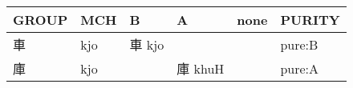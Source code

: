 \documentclass[14pt,a4paper]{scrartcl}
\begin{document}
\begin{longtable}[c]{@{}llllll@{}}
\toprule
\begin{minipage}[b]{0.14\columnwidth}\raggedright\strut
GROUP
\strut\end{minipage} &
\begin{minipage}[b]{0.14\columnwidth}\raggedright\strut
MCH
\strut\end{minipage} &
\begin{minipage}[b]{0.14\columnwidth}\raggedright\strut
B
\strut\end{minipage} &
\begin{minipage}[b]{0.14\columnwidth}\raggedright\strut
A
\strut\end{minipage} &
\begin{minipage}[b]{0.14\columnwidth}\raggedright\strut
none
\strut\end{minipage} &
\begin{minipage}[b]{0.14\columnwidth}\raggedright\strut
PURITY
\strut\end{minipage}\tabularnewline
\midrule
\endhead
\begin{minipage}[t]{0.14\columnwidth}\raggedright\strut
車
\strut\end{minipage} &
\begin{minipage}[t]{0.14\columnwidth}\raggedright\strut
kjo
\strut\end{minipage} &
\begin{minipage}[t]{0.14\columnwidth}\raggedright\strut
車 kjo
\strut\end{minipage} &
\begin{minipage}[t]{0.14\columnwidth}\raggedright\strut
\strut\end{minipage} &
\begin{minipage}[t]{0.14\columnwidth}\raggedright\strut
\strut\end{minipage} &
\begin{minipage}[t]{0.14\columnwidth}\raggedright\strut
pure:B
\strut\end{minipage}\tabularnewline
\begin{minipage}[t]{0.14\columnwidth}\raggedright\strut
庫
\strut\end{minipage} &
\begin{minipage}[t]{0.14\columnwidth}\raggedright\strut
kjo
\strut\end{minipage} &
\begin{minipage}[t]{0.14\columnwidth}\raggedright\strut
\strut\end{minipage} &
\begin{minipage}[t]{0.14\columnwidth}\raggedright\strut
庫 khuH
\strut\end{minipage} &
\begin{minipage}[t]{0.14\columnwidth}\raggedright\strut
\strut\end{minipage} &
\begin{minipage}[t]{0.14\columnwidth}\raggedright\strut
pure:A
\strut\end{minipage}\tabularnewline
\bottomrule
\end{longtable}
\end{document}
